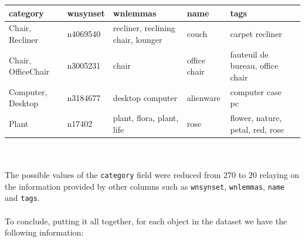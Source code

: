 \documentclass[11pt,a4paper]{article}
\begin{document}
\begin{tabular}{|p{2cm}|p{2cm}|p{3.2cm}|p{2cm}|p{3.2cm}|p{3cm}}
\rowcolor{gray!50}
\hline
category & wnsynset & wnlemmas & name & tags\\
\hline
Chair, Recliner & n4069540 & recliner, reclining chair, lounger & couch & carpet recliner\\
\hline
Chair, OfficeChair & n3005231 & chair & office chair & fauteuil de bureau, office chair\\
\hline
Computer, Desktop & n3184677 & desktop computer & alienware & computer case pc\\
\hline
Plant & n17402 & plant, flora, plant, life & rose & flower, nature, petal, red, rose\\
\hline
\end{tabular}\\
\\
The possible values of the \texttt{category} field were reduced from $270$ to $20$ relaying on the information provided by other columns such as \texttt{wnsynset}, \texttt{wnlemmas}, \texttt{name} and \texttt{tags}.\\
\\
To conclude, putting it all together, for each object in the dataset we have the following information:
\end{document}
